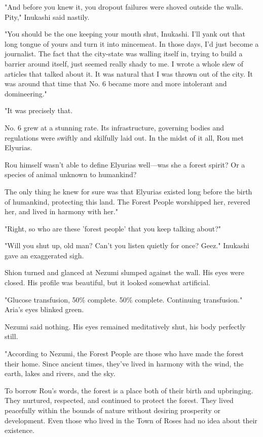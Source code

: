 "And before you knew it, you dropout failures were shoved outside the
walls. Pity," Inukashi said nastily.

"You should be the one keeping your mouth shut, Inukashi. I'll yank out
that long tongue of yours and turn it into mincemeat. In those days, I'd
just become a journalist. The fact that the city-state was walling
itself in, trying to build a barrier around itself, just seemed really
shady to me. I wrote a whole slew of articles that talked about it. It
was natural that I was thrown out of the city. It was around that time
that No. 6 became more and more intolerant and domineering."

"It was precisely that.

No. 6 grew at a stunning rate. Its infrastructure, governing bodies and
regulations were swiftly and skilfully laid out. In the midst of it all,
Rou met Elyurias.

Rou himself wasn't able to define Elyurias well---was she a forest spirit?
Or a species of animal unknown to humankind?

The only thing he knew for sure was that Elyurias existed long before
the birth of humankind, protecting this land. The Forest People
worshipped her, revered her, and lived in harmony with her."

"Right, so who are these 'forest people' that you keep talking about?"

"Will you shut up, old man? Can't you listen quietly for once? Geez."
Inukashi gave an exaggerated sigh.

Shion turned and glanced at Nezumi slumped against the wall. His eyes
were closed. His profile was beautiful, but it looked somewhat
artificial.

{\sffamily "Glucose transfusion, 50\% complete. 50\% complete. Continuing
transfusion."} Aria's eyes blinked green.

Nezumi said nothing. His eyes remained meditatively shut, his body
perfectly still.

\mybreak

"According to Nezumi, the Forest People are those who have made the
forest their home. Since ancient times, they've lived in harmony with
the wind, the earth, lakes and rivers, and the sky.

To borrow Rou's words, the forest is a place both of their birth and
upbringing. They nurtured, respected, and continued to protect the
forest. They lived peacefully within the bounds of nature without
desiring prosperity or development. Even those who lived in the Town of
Roses had no idea about their existence.

